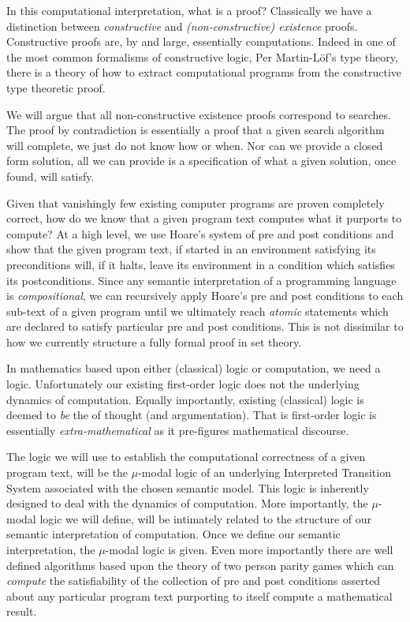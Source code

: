 In this computational interpretation, what is a proof? Classically we have 
a distinction between \emph{constructive} and \emph{(non-constructive) 
existence} proofs. Constructive proofs are, by and large, essentially 
computations. Indeed in one of the most common formalisms of constructive 
logic, Per Martin-L\"of's type theory, there is a theory of how to extract 
computational programs from the constructive type theoretic proof. 

We will argue that all non-constructive existence proofs correspond to 
searches. The proof by contradiction is essentially a proof that a given 
search algorithm will complete, we just do not know how or when. Nor can 
we provide a closed form solution, all we can provide is a specification 
of what a given solution, once found, will satisfy. 

Given that vanishingly few existing computer programs are proven 
completely correct, how do we know that a given program text computes what 
it purports to compute? At a high level, we use Hoare's system of pre and 
post conditions and show that the given program text, if started in an 
environment satisfying its preconditions will, if it halts, leave its 
environment in a condition which satisfies its postconditions. Since any 
semantic interpretation of a programming language is \emph{compositional}, 
we can recursively apply Hoare's pre and post conditions to each sub-text 
of a given program until we ultimately reach \emph{atomic} statements 
which are declared to satisfy particular pre and post conditions. This is 
not dissimilar to how we currently structure a fully formal proof in set 
theory. 

In mathematics based upon either (classical) logic or computation, we need 
a logic. Unfortunately our existing first-order logic does not  the underlying dynamics of computation. Equally importantly, 
existing (classical) logic is deemed to \emph{be} the  of 
 thought (and argumentation). That is first-order logic is 
essentially \emph{extra-mathematical} as it pre-figures mathematical 
discourse.

The logic we will use to establish the computational correctness of a 
given program text, will be the $\mu$-modal logic of an underlying 
Interpreted Transition System associated with the chosen semantic model. 
This logic is inherently designed to deal with the dynamics of 
computation. More importantly, the $\mu$-modal logic we will define, will 
be intimately related to the structure of our semantic interpretation of 
computation. Once we define our semantic interpretation, the $\mu$-modal 
logic is given. Even more importantly there are well defined algorithms 
based upon the theory of two person parity games which can \emph{compute} 
the satisfiability of the collection of pre and post conditions asserted 
about any particular program text purporting to itself compute a 
mathematical result. 

